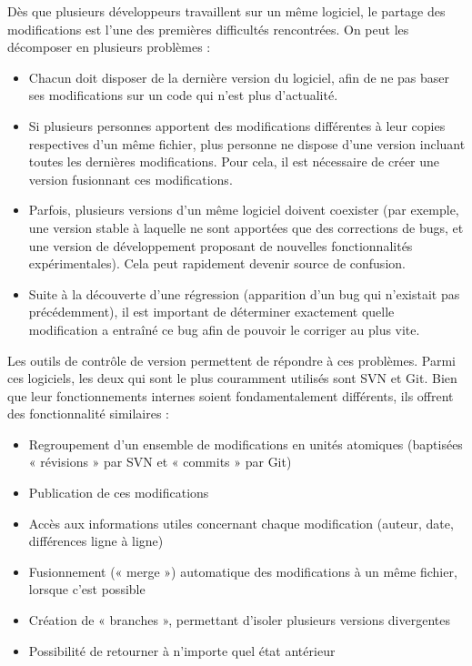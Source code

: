 Dès que plusieurs développeurs travaillent sur un même logiciel, le partage des modifications est l'une des premières difficultés rencontrées. On peut les décomposer en plusieurs problèmes :

\begin{itemize}
\item Chacun doit disposer de la dernière version du logiciel, afin de ne pas baser ses modifications sur un code qui n’est plus d’actualité.
\item Si plusieurs personnes apportent des modifications différentes à leur copies respectives d’un même fichier, plus personne ne dispose d’une version incluant toutes les dernières modifications. Pour cela, il est nécessaire de créer une version fusionnant ces modifications.
\item Parfois, plusieurs versions d’un même logiciel doivent coexister (par exemple, une version stable à laquelle ne sont apportées que des corrections de bugs, et une version de développement proposant de nouvelles fonctionnalités expérimentales). Cela peut rapidement devenir source de confusion.
\item Suite à la découverte d’une régression (apparition d’un bug qui n’existait pas précédemment), il est important de déterminer exactement quelle modification a entraîné ce bug afin de pouvoir le corriger au plus vite.
\end{itemize}


Les outils de contrôle de version permettent de répondre à ces problèmes. Parmi ces logiciels, les deux qui sont le plus couramment utilisés sont SVN et Git. Bien que leur fonctionnements internes soient fondamentalement différents, ils offrent des fonctionnalité similaires :

\begin{itemize}
\item Regroupement d’un ensemble de modifications en unités atomiques (baptisées « révisions » par SVN et « commits » par Git)
\item Publication de ces modifications
\item Accès aux informations utiles concernant chaque modification (auteur, date, différences ligne à ligne)
\item Fusionnement (« merge ») automatique des modifications à un même fichier, lorsque c’est possible
\item Création de « branches », permettant d’isoler plusieurs versions divergentes
\item Possibilité de retourner à n’importe quel état antérieur
\end{itemize}

